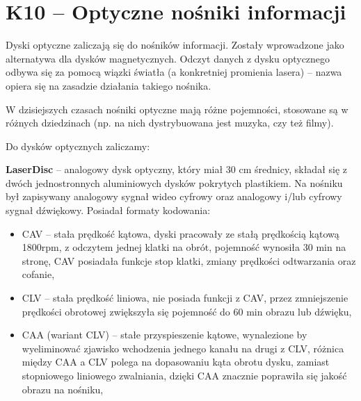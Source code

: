 \sloppy\section{K10 -- Optyczne nośniki informacji}

Dyski optyczne zaliczają się do nośników informacji. Zostały wprowadzone jako alternatywa dla dysków magnetycznych. Odczyt danych z dysku optycznego odbywa się za pomocą wiązki światła (a konkretniej promienia lasera) -- nazwa opiera się na zasadzie działania takiego nośnika.

W dzisiejszych czasach nośniki optyczne mają różne pojemności, stosowane są w różnych dziedzinach (np. na nich dystrybuowana jest muzyka, czy też filmy). 

Do dysków optycznych zaliczamy:

\textbf{LaserDisc} -- analogowy dysk optyczny, który miał 30 cm średnicy, składał się z dwóch jednostronnych aluminiowych dysków pokrytych plastikiem. Na nośniku był zapisywany analogowy sygnał wideo cyfrowy oraz analogowy i/lub cyfrowy sygnał dźwiękowy. Posiadał formaty kodowania:
\begin{itemize}
\item CAV -- stała prędkość kątowa, dyski pracowały ze stałą prędkością kątową 1800rpm, z odczytem jednej klatki na obrót, pojemność wynosiła 30 min na stronę, CAV posiadała funkcje stop klatki, zmiany prędkości odtwarzania oraz cofanie,
\item CLV -- stała prędkość liniowa, nie posiada funkcji z CAV, przez zmniejszenie prędkości obrotowej zwiększyła się pojemność do 60 min obrazu lub dźwięku,
\item CAA (wariant CLV) -- stałe przyspieszenie kątowe, wynalezione by wyeliminować zjawisko wchodzenia jednego kanału na drugi z CLV, różnica między CAA a CLV polega na dopasowaniu kąta obrotu dysku, zamiast stopniowego liniowego zwalniania, dzięki CAA znacznie poprawiła się jakość obrazu na nośniku,
\end{itemize}

